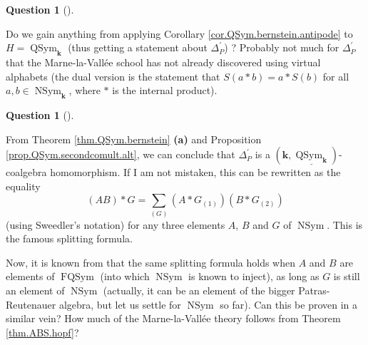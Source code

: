 \documentclass[numbers=enddot,12pt,final,onecolumn,notitlepage,abstracton]{scrartcl}%
\theoremstyle{definition}
\newtheorem{quest}[theo]{Question}
\newenvironment{question}[1][]
{\begin{quest}[#1]\begin{leftbar}}
{\end{leftbar}\end{quest}}
\newenvironment{question}[1][Question]{\noindent\textbf{#1.} }{\ \rule{0.5em}{0.5em}}
\let\sumnonlimits\sum
\renewcommand{\sum}{\sumnonlimits\limits}
\begin{document}
\begin{question}
\label{quest.relhopf}Do we gain anything from applying Corollary
\ref{cor.QSym.bernstein.antipode} to $H=\operatorname*{QSym}%
\nolimits_{\mathbf{k}}$ (thus getting a statement about $\Delta_{P}^{\prime}$)
? Probably not much for $\Delta_{P}^{\prime}$ that the Marne-la-Vall\'{e}e
school has not already discovered using virtual alphabets (the dual version is
the statement that $S\left(  a\ast b\right)  =a\ast S\left(  b\right)  $ for
all $a,b\in\operatorname*{NSym}\nolimits_{\mathbf{k}}$, where $\ast$ is the
internal product).
\end{question}

\begin{question}
\label{quest.split}From Theorem \ref{thm.QSym.bernstein} \textbf{(a)} and
Proposition \ref{prop.QSym.secondcomult.alt}, we can conclude that $\Delta
_{P}^{\prime}$ is a $\left(  \mathbf{k},\underline{\operatorname*{QSym}%
\nolimits_{\mathbf{k}}}\right)  $-coalgebra homomorphism. If I am not
mistaken, this can be rewritten as the equality%
\[
\left(  AB\right)  \ast G=\sum_{\left(  G\right)  }\left(  A\ast G_{\left(
1\right)  }\right)  \left(  B\ast G_{\left(  2\right)  }\right)
\]
(using Sweedler's notation) for any three elements $A$, $B$ and $G$ of
$\operatorname*{NSym}$. This is the famous splitting formula.

Now, it is known from \cite[\S 7]{NCSF7} that the same splitting formula holds
when $A$ and $B$ are elements of $\operatorname*{FQSym}$ (into which
$\operatorname*{NSym}$ is known to inject), as long as $G$ is still an element
of $\operatorname*{NSym}$ (actually, it can be an element of the bigger
Patras-Reutenauer algebra, but let us settle for $\operatorname*{NSym}$ so
far). Can this be proven in a similar vein? How much of the
Marne-la-Vall\'{e}e theory follows from Theorem \ref{thm.ABS.hopf}?
\end{question}
\end{document}
